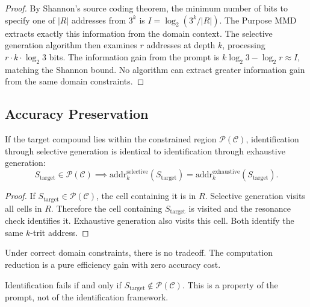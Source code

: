 \begin{proof}
By Shannon's source coding theorem, the minimum number of bits to specify one
of $|R|$ addresses from $3^k$ is $I = \log_2(3^k/|R|)$.  The Purpose MMD
extracts exactly this information from the domain context.  The selective
generation algorithm then examines $r$ addresses at depth $k$, processing
$r \cdot k \cdot \log_2 3$ bits.  The information gain from the prompt is
$k \log_2 3 - \log_2 r \approx I$, matching the Shannon bound.  No algorithm
can extract greater information gain from the same domain constraints.
\end{proof}

\subsection{Accuracy Preservation}
\label{sec:ch24-accuracy}

\begin{theorem}
\label{thm:ch24-accuracy}
If the target compound lies within the constrained region
$\mathcal{P}(\mathcal{C})$, identification through selective generation is
identical to identification through exhaustive generation:
\begin{equation}
  S_{\mathrm{target}} \in \mathcal{P}(\mathcal{C})
  \implies
  \mathrm{addr}_k^{\mathrm{selective}}(S_{\mathrm{target}})
  = \mathrm{addr}_k^{\mathrm{exhaustive}}(S_{\mathrm{target}}).
\end{equation}
\end{theorem}

\begin{proof}
If $S_{\mathrm{target}} \in \mathcal{P}(\mathcal{C})$, the cell containing it
is in $R$.  Selective generation visits all cells in $R$.  Therefore the cell
containing $S_{\mathrm{target}}$ is visited and the resonance check identifies
it.  Exhaustive generation also visits this cell.  Both identify the same
$k$-trit address.
\end{proof}

\begin{corollary}
\label{cor:ch24-no-tradeoff}
Under correct domain constraints, there is no tradeoff.  The computation
reduction is a pure efficiency gain with zero accuracy cost.
\end{corollary}

\begin{corollary}
\label{cor:ch24-completeness}
Identification fails if and only if $S_{\mathrm{target}} \notin
\mathcal{P}(\mathcal{C})$.  This is a property of the prompt, not of the
identification framework.
\end{corollary}

